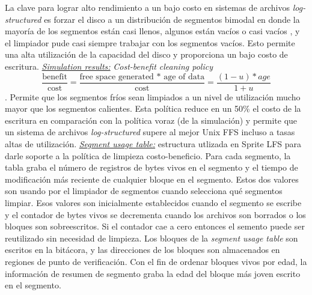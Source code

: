 La clave para lograr alto rendimiento a un bajo costo en sistemas de archivos \emph{log-structured} es forzar el disco a un distribución de segmentos bimodal en donde la mayoría de los segmentos están casi llenos, algunos están vacíos o casi vacíos , y el limpiador pude casi siempre trabajar con los segmentos vacíos. Esto permite una alta utilización de la capacidad  del disco y proporciona un bajo costo de escritura. \underline{\emph{Simulation results:}} \emph{Cost-benefit cleaning policy} $$\frac{\text{benefit}}{\text{cost}} = \frac{\text{free space generated * age of data}}{\text{cost}} = \frac{(1 - u) * age}{1 + u}$$. Permite que los segmentos fríos sean limpiados a un nivel de utilización mucho mayor que los segmentos calientes. Esta política reduce en un 50\% el costo de la escritura en comparación con la política voraz (de la simulación) y permite que un sistema de archivos \emph{log-structured} supere al mejor Unix FFS incluso a tasas altas de utilización. \underline{\emph{Segment usage table:}} estructura utlizada en Sprite LFS para darle soporte a la política de limpieza costo-beneficio. Para cada segmento, la tabla graba el número de registros de bytes vivos en el segmento y el tiempo de modificación más reciente de cualquier bloque en el segmento. Estos dos valores son usando por el limpiador de segmentos cuando selecciona qué segmentos limpiar. Esos valores son inicialmente establecidos cuando el segmento se escribe y el contador de bytes vivos se decrementa  cuando los archivos son borrados o los bloques son sobreescritos. Si el contador cae a cero entonces el semento puede ser reutilizado sin necesidad de limpieza. Los bloques de la \emph{segment usage table} son escritos en la bitácora, y las direcciones de los bloques son almacenados en regiones de punto de verificación. Con el fin de ordenar bloques vivos por edad, la información de resumen de segmento graba la edad del bloque más joven escrito en el segmento.

